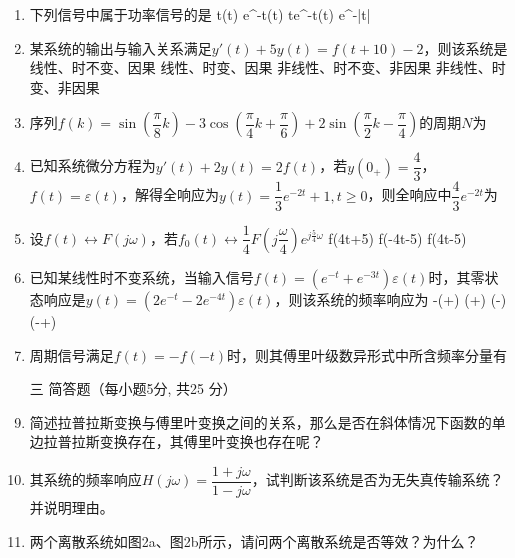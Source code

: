 \documentclass[11pt,twoside]{ctexart}
\begin{document}
\begin{enumerate}[leftmargin=0em]
\begin{center}
{图1}
\end{center}
\item 下列信号中属于功率信号的是
\xxs%
{\cos t\varepsilon(t)}%
{e^{-t}\varepsilon(t)}%
{te^{-t}\varepsilon(t)}%
{e^{-|t|}}
\item 某系统的输出与输入关系满足$y'(t)+5y(t)=f(t+10)-2$，则该系统是
\xx%
{线性、时不变、因果}%
{线性、时变、因果}%
{非线性、时不变、非因果}%
{非线性、时变、非因果}
\item 序列$f(k)=\sin\left(\dfrac{\pi}{8}k\right)-3\cos\left(\dfrac{\pi}{4}k+\dfrac{\pi}{6}\right)+2\sin\left(\dfrac{\pi}{2}k-\dfrac{\pi}{4}\right)$的周期$N$为

\item 已知系统微分方程为$y'(t)+2y(t)=2f(t)$，若$y(0_+)=\dfrac{4}{3}$，$f(t)=\varepsilon(t)$，解得全响应为$y(t)=\dfrac{1}{3}e^{-2t}+1,t\geqslant 0$，则全响应中$\dfrac{4}{3}e^{-2t}$为
\item 设$f(t)\leftrightarrow F(j\omega)$，若$f_0(t)\leftrightarrow \dfrac{1}{4}F\left(j\dfrac{\omega}{4}\right)e^{j\frac{5}{4}\omega}$
%
{f(4t+5)}%
{f(-4t-5)}%
{f(4t-5)}
\newpage
\vspace{3em}
\item  已知某线性时不变系统，当输入信号$f(t)=(e^{-t}+e^{-3t})\varepsilon(t)$时，其零状态响应是$y(t)=(2e^{-t}-2e^{-4t})\varepsilon(t)$，则该系统的频率响应为
\xxs
{-\left(+\right)}
{\left(+\right)}
{\left(-\right)}
{\left(-+\right)}
\vspace*{3em}
\item 周期信号满足$f(t)=-f(-t)$时，则其傅里叶级数异形式中所含频率分量有
\vspace{3em}\setlength{\itemsep}{0em}\setcounter{enumi}{0}
\item[\kaishu{}三]{\kaishu{}简答题（每小题5分, 共25 分）}%
\item 简述拉普拉斯变换与傅里叶变换之间的关系，那么是否在斜体情况下函数的单边拉普拉斯变换存在，其傅里叶变换也存在呢？\setlength{\itemsep}{8em}
\item 其系统的频率响应$H(j\omega)=\dfrac{1+j\omega}{1-j\omega}$，试判断该系统是否为无失真传输系统？并说明理由。
\item 两个离散系统如图2a、图2b所示，请问两个离散系统是否等效？为什么？

\end{enumerate}
\end{document}
